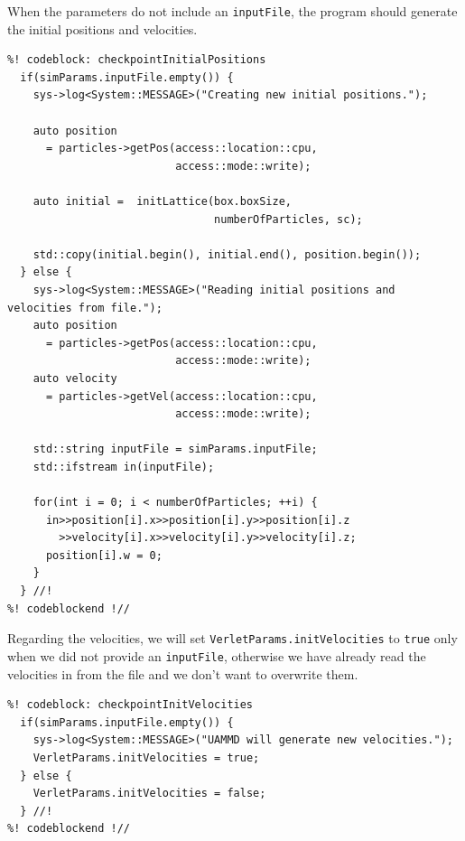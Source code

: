 When the parameters do not include an \texttt{inputFile}, the program should 
generate the initial positions and velocities.
\begin{lstlisting}
%! codeblock: checkpointInitialPositions
  if(simParams.inputFile.empty()) {
    sys->log<System::MESSAGE>("Creating new initial positions.");

    auto position
      = particles->getPos(access::location::cpu,
                          access::mode::write);

    auto initial =  initLattice(box.boxSize,
                                numberOfParticles, sc);

    std::copy(initial.begin(), initial.end(), position.begin());
  } else {
    sys->log<System::MESSAGE>("Reading initial positions and velocities from file.");
    auto position
      = particles->getPos(access::location::cpu,
                          access::mode::write);
    auto velocity
      = particles->getVel(access::location::cpu,
                          access::mode::write);

    std::string inputFile = simParams.inputFile;
    std::ifstream in(inputFile);

    for(int i = 0; i < numberOfParticles; ++i) {
      in>>position[i].x>>position[i].y>>position[i].z
        >>velocity[i].x>>velocity[i].y>>velocity[i].z;
      position[i].w = 0;
    }
  } //!
%! codeblockend !//
\end{lstlisting}

Regarding the velocities, we will set \texttt{VerletParams.initVelocities} to 
\texttt{true} only when we did not provide an \texttt{inputFile}, otherwise we 
have already read the velocities in from the file and we don't want to 
overwrite them.
\begin{lstlisting}
%! codeblock: checkpointInitVelocities
  if(simParams.inputFile.empty()) {
    sys->log<System::MESSAGE>("UAMMD will generate new velocities.");
    VerletParams.initVelocities = true;
  } else {
    VerletParams.initVelocities = false;
  } //!
%! codeblockend !//
\end{lstlisting}


